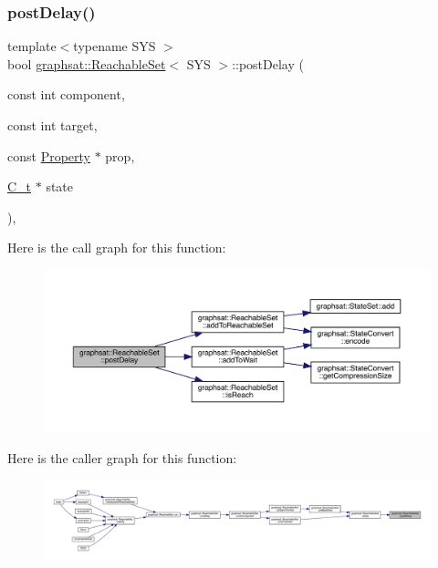 \subsubsection{\texorpdfstring{postDelay()}{postDelay()}}
{\footnotesize\ttfamily template$<$typename S\+YS $>$ \\
bool \mbox{\hyperlink{classgraphsat_1_1_reachable_set}{graphsat\+::\+Reachable\+Set}}$<$ S\+YS $>$\+::post\+Delay (\begin{DoxyParamCaption}\item[{const int}]{component,  }\item[{const int}]{target,  }\item[{const \mbox{\hyperlink{classgraphsat_1_1_property}{Property}} $\ast$}]{prop,  }\item[{\mbox{\hyperlink{classgraphsat_1_1_reachable_set_a0b7981a216ec4c46be913e08d5f0cd07}{C\+\_\+t}} $\ast$}]{state }\end{DoxyParamCaption})\hspace{0.3cm}{\ttfamily [inline]}, {\ttfamily [private]}}

Here is the call graph for this function\+:
\nopagebreak
\begin{figure}[H]
\begin{center}
\leavevmode
\includegraphics[width=350pt]{classgraphsat_1_1_reachable_set_a8624402e154b2c700e99f8d5f6df23a2_cgraph}
\end{center}
\end{figure}
Here is the caller graph for this function\+:
\nopagebreak
\begin{figure}[H]
\begin{center}
\leavevmode
\includegraphics[width=350pt]{classgraphsat_1_1_reachable_set_a8624402e154b2c700e99f8d5f6df23a2_icgraph}
\end{center}
\end{figure}
\mbox{\label{classgraphsat_1_1_reachable_set_aa69dd707012183b8c262362d6fb41907}} 
